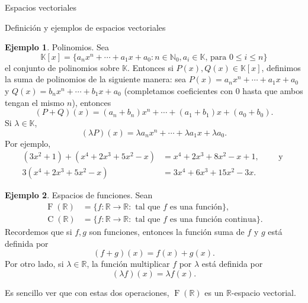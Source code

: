 \documentclass[a4paper,12pt,twoside,spanish,reqno]{amsbook}
\theoremstyle{definition}
\newtheorem{ejemplo}{Ejemplo}[section]
\theoremstyle{remark}
\newcommand{\R}{\mathbb R}
\newcommand{\K}{\mathbb K}
\begin{document}
\begin{chapter}{Espacios vectoriales}
\begin{section}{Definición y ejemplos de espacios vectoriales}
			\begin{ejemplo}{\sc Polinomios.} Sea 
				\begin{equation*}
				\K[x] = \{a_nx^n + \cdots + a_1x + a_0: n \in \mathbb N_0, a_i \in \K\text{, para } 0\le i \le n  \}
				\end{equation*}
				el conjunto de polinomios sobre $\K$. Entonces si $P(x), Q(x) \in \K[x]$, definimos la suma de polinomios de la siguiente manera: sea $P(x) = a_nx^n + \cdots + a_1x + a_0$ y $Q(x)= b_nx^n + \cdots + b_1x + a_0$ (completamos coeficientes con 0 hasta que ambos tengan el mismo $n$), entonces
				\begin{equation*}
				(P+Q)(x) = (a_n+b_n)x^n + \cdots + (a_1+ b_1)x + (a_0+b_0).
				\end{equation*}
				Si $\lambda \in \K$, 
				\begin{equation*}
				(\lambda P)(x) = \lambda a_nx^n + \cdots + \lambda a_1x + \lambda a_0.
				\end{equation*}
				Por ejemplo,
				\begin{align*}
				(3x^2 + 1)+(x^4 + 2x^3 + 5x^2-x) &= x^4 + 2x^3 + 8x^2-x +1, \qquad \text{ y } \\
				3(x^4 + 2x^3 + 5x^2-x) &= 3x^4 + 6x^3 + 15x^2-3x.
				\end{align*}
			\end{ejemplo}
			
			
			\medspace
			
			\begin{ejemplo}{\sc Espacios de funciones.} Sean
				\begin{align*}
				\operatorname{F}(\R) &= \{f: \R \to \R: \text{ tal que } f \text{ es una función} \},\\
				\operatorname{C}(\R) &= \{f: \R \to \R: \text{ tal que }  f  \text{ es una función continua} \}.
				\end{align*}
				Recordemos que si $f,g$ son funciones, entonces la función suma de $f$ y $g$ está definida por
				\begin{equation*}
				(f+g)(x) = f(x) + g(x).
				\end{equation*}
				Por otro lado, si $\lambda \in \R$, la función multiplicar $f$ por $\lambda $ está definida por
				\begin{equation*}
				(\lambda f)(x) = \lambda f(x).
				\end{equation*}			
								
				Es sencillo ver que con estas dos operaciones, $\operatorname{F}(\R)$ es un $\R$-espacio vectorial.
				

\end{ejemplo}
\end{section}
\end{chapter}
\end{document}
